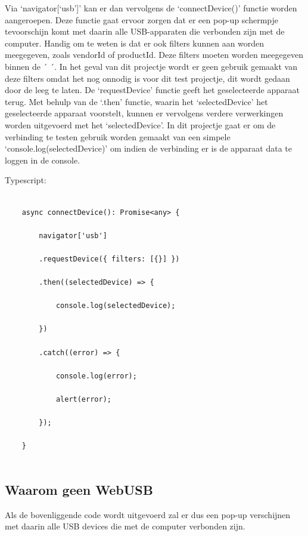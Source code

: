 Via ‘navigator[‘usb’]’ kan er dan vervolgens de ‘connectDevice()’ functie worden aangeroepen. Deze functie gaat ervoor zorgen dat er een pop-up schermpje tevoorschijn komt met daarin alle USB-apparaten die verbonden zijn met de computer. Handig om te weten is dat er ook filters kunnen aan worden meegegeven, zoals vendorId of productId. Deze filters moeten worden meegegeven binnen de ´{ }´. In het geval van dit projectje wordt er geen gebruik gemaakt van deze filters omdat het nog onnodig is voor dit test projectje, dit wordt gedaan door de { } leeg te laten. De ‘requestDevice’ functie geeft het geselecteerde apparaat terug. Met behulp van de ‘.then’ functie, waarin het ‘selectedDevice’ het geselecteerde apparaat voorstelt, kunnen er vervolgens verdere verwerkingen worden uitgevoerd met het ‘selectedDevice’. In dit projectje gaat er om de verbinding te testen gebruik worden gemaakt van een simpele ‘console.log(selectedDevice)’ om indien de verbinding er is de apparaat data te loggen in de console. 

Typescript: 
\begin{verbatim} 
    
    async connectDevice(): Promise<any> { 
        
        navigator['usb'] 
        
        .requestDevice({ filters: [{}] }) 
        
        .then((selectedDevice) => { 
            
            console.log(selectedDevice); 
            
        }) 
        
        .catch((error) => { 
            
            console.log(error); 
            
            alert(error); 
            
        }); 
        
    } 
    
\end{verbatim} 

\subsection{Waarom geen WebUSB}
Als de bovenliggende code wordt uitgevoerd zal er dus een pop-up verschijnen met daarin alle USB devices die met de computer verbonden zijn.

